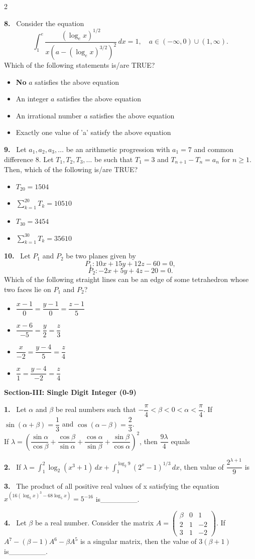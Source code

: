 \documentclass[10pt]{extarticle}
\newcommand{\sect}[1]{\par\smallskip\noindent\textbf{#1}\par}
\newcommand{\qn}[1]{\par\smallskip\noindent\textbf{#1.}~}
\newenvironment{qoptions}{\begin{itemize}[leftmargin=1.8em,itemsep=1pt,topsep=2pt,label={}]}{\end{itemize}}
\newcommand{\opt}[2]{\item[(#1)] #2}
\begin{document}
\begin{multicols}{2}
\qn{8} Consider the equation
$$\int_1^e \dfrac{(\log_e x)^{1/2}}{x\left(a-(\log_e x)^{3/2}\right)^2}\,dx = 1,\quad a\in(-\infty,0)\cup(1,\infty).$$
Which of the following statements is/are TRUE?
\begin{qoptions}
\opt{A}{\textbf{No} $a$ satisfies the above equation}
\opt{B}{An integer $a$ satisfies the above equation}
\opt{C}{An irrational number $a$ satisfies the above equation}
\opt{D}{Exactly one value of 'a' satisfy the above equation}
\end{qoptions}

\qn{9} Let $a_1,a_2,a_3,\ldots$ be an arithmetic progression with $a_1=7$ and common difference 8. Let $T_1,T_2,T_3,\ldots$ be such that $T_1=3$ and $T_{n+1}-T_n=a_n$ for $n\ge1$. Then, which of the following is/are TRUE?
\begin{qoptions}
\opt{A}{$T_{20}=1504$}
\opt{B}{$\displaystyle\sum_{k=1}^{20}T_k=10510$}
\opt{C}{$T_{30}=3454$}
\opt{D}{$\displaystyle\sum_{k=1}^{30}T_k=35610$}
\end{qoptions}

\qn{10} Let $P_1$ and $P_2$ be two planes given by
$$P_1: 10x+15y+12z-60=0,$$
$$P_2: -2x+5y+4z-20=0.$$
Which of the following straight lines can be an edge of some tetrahedron whose two faces lie on $P_1$ and $P_2$?
\begin{qoptions}
\opt{A}{$\dfrac{x-1}{0}=\dfrac{y-1}{0}=\dfrac{z-1}{5}$}
\opt{B}{$\dfrac{x-6}{-5}=\dfrac{y}{2}=\dfrac{z}{3}$}
\opt{C}{$\dfrac{x}{-2}=\dfrac{y-4}{5}=\dfrac{z}{4}$}
\opt{D}{$\dfrac{x}{1}=\dfrac{y-4}{-2}=\dfrac{z}{4}$}
\end{qoptions}

\sect{Section-III: Single Digit Integer (0-9)}

\qn{1} Let $\alpha$ and $\beta$ be real numbers such that $-\dfrac{\pi}{4}<\beta<0<\alpha<\dfrac{\pi}{4}$. If $\sin(\alpha+\beta)=\dfrac13$ and $\cos(\alpha-\beta)=\dfrac23$.\\
If $\lambda = \left(\dfrac{\sin\alpha}{\cos\beta}+\dfrac{\cos\beta}{\sin\alpha}+\dfrac{\cos\alpha}{\sin\beta}+\dfrac{\sin\beta}{\cos\alpha}\right)^2$, then $\dfrac{9\lambda}{4}$ equals

\qn{2} If $\lambda = \displaystyle\int_1^2\log_2(x^3+1)\,dx + \int_1^{\log_2 9}(2^x-1)^{1/3}\,dx$, then value of $\dfrac{2^{\lambda+1}}{9}$ is

\qn{3} The product of all positive real values of x satisfying the equation $x^{(16(\log_5x)^3-68\log_5x)} = 5^{-16}$ is\_\_\_\_\_\_\_.

\qn{4} Let $\beta$ be a real number. Consider the matrix $A = \begin{pmatrix}\beta & 0 & 1\\ 2 & 1 & -2\\ 3 & 1 & -2\end{pmatrix}$. If $A^7-(\beta-1)A^6-\beta A^5$ is a singular matrix, then the value of $3(\beta+1)$ is\_\_\_\_\_\_\_.


\end{multicols}
\end{document}

